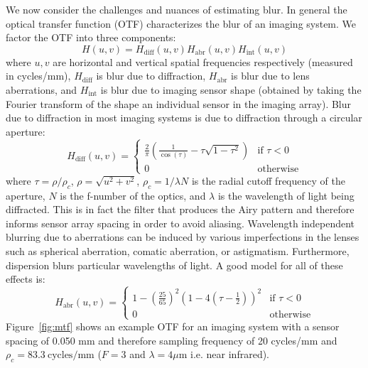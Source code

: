 We now consider the challenges and nuances of estimating blur.
%
In general the optical transfer function (OTF) characterizes the blur of an imaging system.
%
We factor the OTF into three components:
\begin{equation}
    H(u, v) = H_{\text{diff}}(u,v) H_{\text{abr}}(u,v) H_{\text{int}} (u,v)
\end{equation}
where $u,v$ are horizontal and vertical spatial frequencies respectively (measured in cycles/mm), $H_{\text{diff}}$ is blur due to diffraction, $H_{\text{abr}}$ is blur due to lens aberrations, and $H_{\text{int}}$ is blur due to imaging sensor shape (obtained by taking the Fourier transform of the shape an individual sensor in the imaging array).
%
Blur due to diffraction in most imaging systems is due to diffraction through a circular aperture\cite{goodman2005introduction}:
\begin{equation*}
    H_{\text{diff}}(u,v) =   \begin{cases}
                                 \frac{2}{\pi} \left(\frac{1}{\cos(\tau)} - \tau \sqrt{1-\tau^2}\right) & \text{if } \tau < 0 \\
                                 0 & \text{otherwise}
    \end{cases}
\end{equation*}
where $\tau = \rho/\rho_c$, $\rho=\sqrt{u^2 +v^2}$, $\rho_c = 1/\lambda N$ is the radial cutoff frequency of the aperture, $N$ is the f-number of the optics, and $\lambda$ is the wavelength of light being diffracted.
%
This is in fact the filter that produces the Airy pattern and therefore informs sensor array spacing in order to avoid aliasing.
%
Wavelength independent blurring due to aberrations can be induced by various imperfections in the lenses such as spherical aberration, comatic aberration, or astigmatism. Furthermore, dispersion blurs particular wavelengths of light. A good model for all of these effects is\cite{10.1117.12.946501}:
\begin{equation*}
    H_{\text{abr}}(u,v) =   \begin{cases}
                                1-\left(\frac{25}{65}\right)^2 \left(1-4\left(\tau - \frac{1}{2}\right)\right)^2& \text{if } \tau < 0 \\
                                0 & \text{otherwise}
    \end{cases}
\end{equation*}
Figure~\ref{fig:mtf} shows an example OTF for an imaging system with a sensor spacing of 0.050 mm and therefore sampling frequency of 20 cycles/mm and $\rho_c = 83.3~\text{cycles}/\text{mm}$ ($F=3$ and $\lambda = 4\mu\text{m}$ i.e. near infrared).
